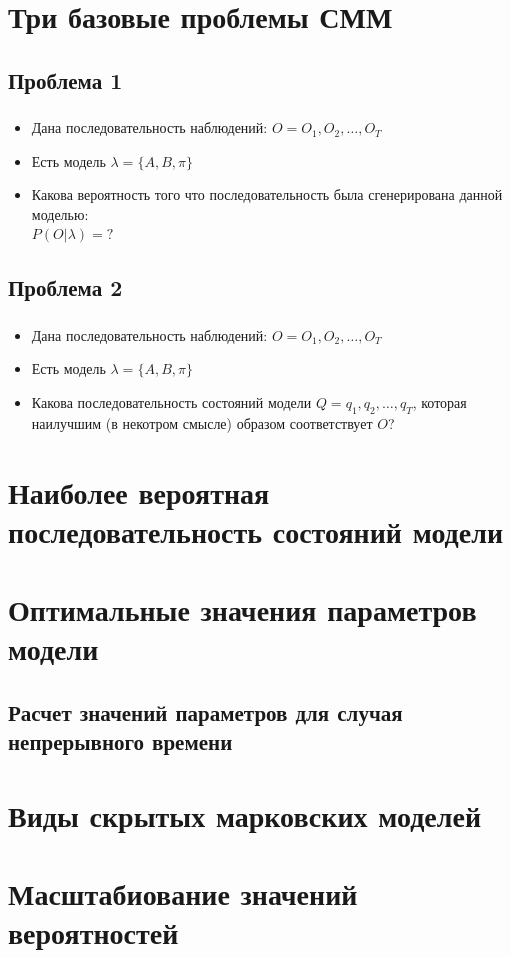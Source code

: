 \documentclass{beamer}
\begin{document}
\section{Три базовые проблемы СММ}
\subsection{Проблема 1}

\begin{frame} 
  \frametitle{\insertsection}
  \framesubtitle{\insertsubsection}
  \begin{itemize}
  \item Дана последовательность наблюдений: $O = O_1, O_2, \ldots, O_T$
  \item Есть модель $\lambda = \{A, B, \pi \}$
  \item Какова вероятность того что последовательность была сгенерирована данной моделью: \\
    $P(O | \lambda) = ?$
  \end{itemize}
\end{frame}

\subsection{Проблема 2}

\begin{frame} 
  \frametitle{\insertsection}
  \framesubtitle{\insertsubsection}
  \begin{itemize}
  \item Дана последовательность наблюдений: $O = O_1, O_2, \ldots, O_T$
  \item Есть модель $\lambda = \{A, B, \pi \}$
  \item Какова последовательность состояний модели $Q = q_1, q_2, \ldots, q_T$, которая наилучшим (в некотром смысле) образом соответствует $O$?
  \end{itemize}
\end{frame}


\section{Наиболее вероятная последовательность состояний модели}

\section{Оптимальные значения параметров модели}
\subsection{Расчет значений параметров для случая непрерывного времени}

\section{Виды скрытых марковских моделей}

\section{Масштабиование значений вероятностей}
\end{document}
